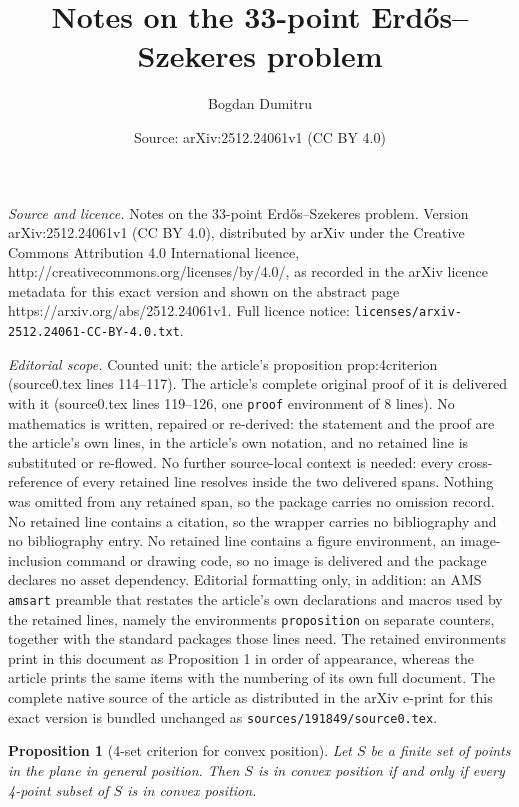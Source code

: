 \documentclass[10pt,a4paper]{amsart}
\title{Notes on the 33-point Erd\H{o}s--Szekeres problem}
\author{Bogdan Dumitru}
\date{Source: arXiv:2512.24061v1 (CC BY 4.0)}
\newtheorem{proposition}{Proposition}
\begin{document}
\maketitle

\noindent\emph{Source and licence.} Notes on the 33-point Erd\H{o}s--Szekeres problem. Version arXiv:2512.24061v1 (CC BY 4.0), distributed by arXiv under the Creative Commons Attribution 4.0 International licence, http://creativecommons.org/licenses/by/4.0/, as recorded in the arXiv licence metadata for this exact version and shown on the abstract page https://arxiv.org/abs/2512.24061v1. Full licence notice: \texttt{licenses/arxiv-2512.24061-CC-BY-4.0.txt}.\par\smallskip

\noindent\textit{Editorial scope.} Counted unit: the article's proposition prop:4criterion (source0.tex lines 114--117). The article's complete original proof of it is delivered with it (source0.tex lines 119--126, one \texttt{proof} environment of 8 lines). No mathematics is written, repaired or re-derived: the statement and the proof are the article's own lines, in the article's own notation, and no retained line is substituted or re-flowed.  No further source-local context is needed: every cross-reference of every retained line resolves inside the two delivered spans.  Nothing was omitted from any retained span, so the package carries no omission record.  No retained line contains a citation, so the wrapper carries no bibliography and no bibliography entry.  No retained line contains a figure environment, an image-inclusion command or drawing code, so no image is delivered and the package declares no asset dependency.  Editorial formatting only, in addition: an AMS \texttt{amsart} preamble that restates the article's own declarations and macros used by the retained lines, namely the environments \texttt{proposition} on separate counters, together with the standard packages those lines need.  The retained environments print in this document as Proposition 1 in order of appearance, whereas the article prints the same items with the numbering of its own full document.  The complete native source of the article as distributed in the arXiv e-print for this exact version is bundled unchanged as \texttt{sources/191849/source0.tex}.
\begin{proposition}[4-set criterion for convex position]\label{prop:4criterion}
Let $S$ be a finite set of points in the plane in general position.
Then $S$ is in convex position if and only if every 4-point subset of $S$ is in convex position.
\end{proposition}
\end{document}
